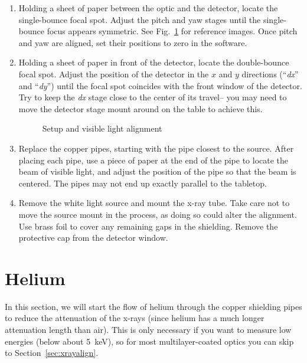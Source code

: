 \begin{enumerate}
\item Holding a sheet of paper between the optic and the detector, locate the single-bounce focal spot. Adjust the pitch and yaw stages until the single-bounce focus appears symmetric. See Fig.~\ref{fig:vis_align} for reference images. Once pitch and yaw are aligned, set their positions to zero in the software.

\item Holding a sheet of paper in front of the detector, locate the double-bounce focal spot. Adjust the position of the detector in the $x$ and $y$ directions (``\textit{dx}'' and ``\textit{dy}'') until the focal spot coincides with the front window of the detector. Try to keep the \textit{dx} stage close to the center of its travel-- you may need to move the detector stage mount around on the table to achieve this.

\begin{figure}
\caption{\label{fig:vis_align} Setup and visible light alignment}
\end{figure}

\item Replace the copper pipes, starting with the pipe closest to the source. After placing each pipe, use a piece of paper at the end of the pipe to locate the beam of visible light, and adjust the position of the pipe so that the beam is centered. The pipes may not end up exactly parallel to the tabletop.

\item Remove the white light source and mount the x-ray tube. Take care not to move the source mount in the process, as doing so could alter the alignment. Use brass foil to cover any remaining gaps in the shielding. Remove the protective cap from the detector window.

\end{enumerate}


\section{Helium\label{sec:he}}

In this section, we will start the flow of helium through the copper shielding pipes to reduce the attenuation of the x-rays (since helium has a much longer attenuation length than air). This is only necessary if you want to measure low energies (below about 5~keV), so for most multilayer-coated optics you can skip to Section~\ref{sec:xrayalign}.

